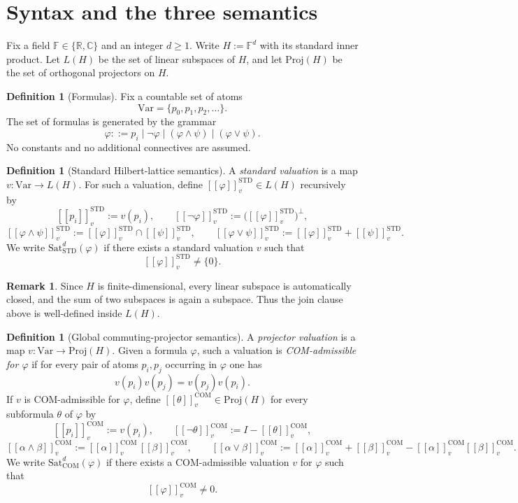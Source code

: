 \documentclass[11pt]{article}
\theoremstyle{plain}
\theoremstyle{definition}
\newtheorem{definition}[theorem]{Definition}
\newtheorem{remark}[theorem]{Remark}
\newcommand{\STD}{\mathrm{STD}}
\newcommand{\COM}{\mathrm{COM}}
\newcommand{\Sat}{\mathrm{Sat}}
\newcommand{\Proj}{\mathrm{Proj}}
\newcommand{\Var}{\mathrm{Var}}
\newcommand{\sem}[1]{\left[\!\left[#1\right]\!\right]}
\newcommand{\field}{\mathbb{F}}
\begin{document}
\section{Syntax and the three semantics}

Fix a field $\field\in\{\mathbb{R},\mathbb{C}\}$ and an integer $d\geq 1$.
Write $H:=\field^d$ with its standard inner product.
Let $L(H)$ be the set of linear subspaces of $H$, and let $\Proj(H)$ be the set of orthogonal projectors on $H$.

\begin{definition}[Formulas]
Fix a countable set of atoms
\[
\Var=\{p_0,p_1,p_2,\dots\}.
\]
The set of formulas is generated by the grammar
\[
\varphi ::= p_i \mid \neg\varphi \mid (\varphi\wedge\psi) \mid (\varphi\vee\psi).
\]
No constants and no additional connectives are assumed.
\end{definition}

\begin{definition}[Standard Hilbert-lattice semantics]
A \emph{standard valuation} is a map $v:\Var\to L(H)$.
For such a valuation, define $\sem{\varphi}^{\STD}_v\in L(H)$ recursively by
\[
\sem{p_i}^{\STD}_v := v(p_i),
\qquad
\sem{\neg\varphi}^{\STD}_v := \bigl(\sem{\varphi}^{\STD}_v\bigr)^{\perp},
\]
\[
\sem{\varphi\wedge\psi}^{\STD}_v := \sem{\varphi}^{\STD}_v\cap \sem{\psi}^{\STD}_v,
\qquad
\sem{\varphi\vee\psi}^{\STD}_v := \sem{\varphi}^{\STD}_v + \sem{\psi}^{\STD}_v.
\]
We write $\Sat_{\STD}^d(\varphi)$ if there exists a standard valuation $v$ such that
\[
\sem{\varphi}^{\STD}_v \neq \{0\}.
\]
\end{definition}

\begin{remark}
Since $H$ is finite-dimensional, every linear subspace is automatically closed, and the sum of two subspaces is again a subspace.
Thus the join clause above is well-defined inside $L(H)$.
\end{remark}

\begin{definition}[Global commuting-projector semantics]
A \emph{projector valuation} is a map $v:\Var\to \Proj(H)$.
Given a formula $\varphi$, such a valuation is \emph{COM-admissible for $\varphi$} if for every pair of atoms $p_i,p_j$ occurring in $\varphi$ one has
\[
 v(p_i)v(p_j)=v(p_j)v(p_i).
\]
If $v$ is COM-admissible for $\varphi$, define $\sem{\theta}^{\COM}_v\in\Proj(H)$ for every subformula $\theta$ of $\varphi$ by
\[
\sem{p_i}^{\COM}_v := v(p_i),
\qquad
\sem{\neg\theta}^{\COM}_v := I-\sem{\theta}^{\COM}_v,
\]
\[
\sem{\alpha\wedge\beta}^{\COM}_v := \sem{\alpha}^{\COM}_v\,\sem{\beta}^{\COM}_v,
\qquad
\sem{\alpha\vee\beta}^{\COM}_v := \sem{\alpha}^{\COM}_v + \sem{\beta}^{\COM}_v - \sem{\alpha}^{\COM}_v\sem{\beta}^{\COM}_v.
\]
We write $\Sat_{\COM}^d(\varphi)$ if there exists a COM-admissible valuation $v$ for $\varphi$ such that
\[
\sem{\varphi}^{\COM}_v \neq 0.
\]
\end{definition}
\end{document}
